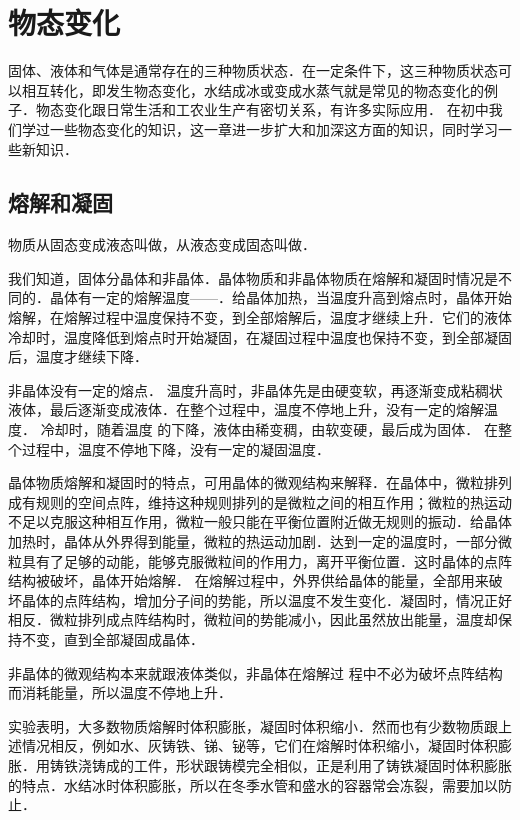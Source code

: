\chapter{物态变化}\label{chapter-change-of-state-of-matter}

固体、液体和气体是通常存在的三种物质状态．在一定条件下，这三种物质状态可以相互转化，即发生物态变化，水结成冰或变成水蒸气就是常见的物态变化的例子．物态变化跟日常生活和工农业生产有密切关系，有许多实际应用．
在初中我们学过一些物态变化的知识，这一章进一步扩大和加深这方面的知识，同时学习一些新知识．

\section{熔解和凝固}
物质从固态变成液态叫做，从液态变成固态叫做．

我们知道，固体分晶体和非晶体．晶体物质和非晶体物质在熔解和凝固时情况是不同的．晶体有一定的熔解温度——．给晶体加热，当温度升高到熔点时，晶体开始熔解，在熔解过程中温度保持不变，到全部熔解后，温度才继续上升．它们的液体冷却时，温度降低到熔点时开始凝固，在凝固过程中温度也保持不变，到全部凝固后，温度才继续下降．

非晶体没有一定的熔点．
温度升高时，非晶体先是由硬变软，再逐渐变成粘稠状液体，最后逐渐变成液体．在整个过程中，温度不停地上升，没有一定的熔解温度．
冷却时，随着温度
的下降，液体由稀变稠，由软变硬，最后成为固体．
在整个过程中，温度不停地下降，没有一定的凝固温度．

晶体物质熔解和凝固时的特点，可用晶体的微观结构来解释．在晶体中，微粒排列成有规则的空间点阵，维持这种规则排列的是微粒之间的相互作用；微粒的热运动不足以克服这种相互作用，微粒一般只能在平衡位置附近做无规则的振动．给晶体加热时，晶体从外界得到能量，微粒的热运动加剧．达到一定的温度时，一部分微粒具有了足够的动能，能够克服微粒间的作用力，离开平衡位置．这时晶体的点阵结构被破坏，晶体开始熔解．
在熔解过程中，外界供给晶体的能量，全部用来破坏晶体的点阵结构，增加分子间的势能，所以温度不发生变化．凝固时，情况正好相反．微粒排列成点阵结构时，微粒间的势能减小，因此虽然放出能量，温度却保持不变，直到全部凝固成晶体．

非晶体的微观结构本来就跟液体类似，非晶体在熔解过
程中不必为破坏点阵结构而消耗能量，所以温度不停地上升．

实验表明，大多数物质熔解时体积膨胀，凝固时体积缩小．然而也有少数物质跟上述情况相反，例如水、灰铸铁、锑、铋等，它们在熔解时体积缩小，凝固时体积膨胀．用铸铁浇铸成的工件，形状跟铸模完全相似，正是利用了铸铁凝固时体积膨胀的特点．水结冰时体积膨胀，所以在冬季水管和盛水的容器常会冻裂，需要加以防止．

